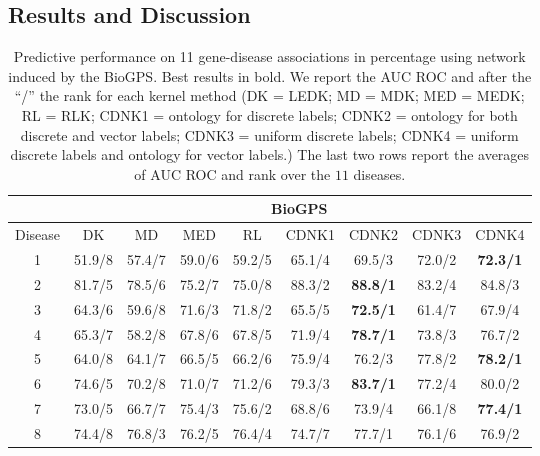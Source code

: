 \documentclass[review]{elsarticle}
\begin{document}
\subsection{Results and Discussion}
\begin{table}[h]
\caption{Predictive performance on 11 gene-disease associations in percentage using network induced by the BioGPS. Best results in bold. We report the AUC ROC and after the ``/'' the rank for each kernel method (DK = LEDK; MD = MDK; MED = MEDK; RL = RLK; CDNK1 = ontology for discrete labels; CDNK2 = ontology for both discrete and vector labels; CDNK3 = uniform discrete labels;  CDNK4 = uniform discrete labels and ontology for vector labels.) The last two rows report the averages of AUC ROC and rank over the $11$ diseases.} \vspace{1em}
\centering
\setlength{\tabcolsep}{1mm}
\begin{tabular}{|c|c|c|c|c|c|c|c|c|}
\hline
         & \multicolumn{8}{c|}{\textbf{BioGPS}}\\
 \hline
Disease & DK & MD & MED & RL & CDNK1 & CDNK2 & CDNK3 & CDNK4\\

 \hline
1 & 51.9/8 & 57.4/7 & 59.0/6 & 59.2/5 & 65.1/4 & 69.5/3 & 72.0/2 & \textbf{72.3/1} \\

2 & 81.7/5 & 78.5/6 & 75.2/7 & 75.0/8 & 88.3/2 & \textbf{88.8/1} & 83.2/4 & 84.8/3 \\

3 & 64.3/6 & 59.6/8 & 71.6/3 & 71.8/2 & 65.5/5 & \textbf{72.5/1} & 61.4/7 & 67.9/4 \\

4 & 65.3/7 & 58.2/8 & 67.8/6 & 67.8/5 & 71.9/4 & \textbf{78.7/1} & 73.8/3 & 76.7/2 \\

5 & 64.0/8 & 64.1/7 & 66.5/5 & 66.2/6 & 75.9/4 & 76.2/3 & 77.8/2 & \textbf{78.2/1} \\

6 & 74.6/5 & 70.2/8 & 71.0/7 & 71.2/6 & 79.3/3 & \textbf{83.7/1} & 77.2/4 & 80.0/2 \\

7 & 73.0/5 & 66.7/7 & 75.4/3 & 75.6/2 & 68.8/6 & 73.9/4 & 66.1/8 & \textbf{77.4/1} \\

8 & 74.4/8 & 76.8/3 & 76.2/5 & 76.4/4 & 74.7/7 & 77.7/1 & 76.1/6 & 76.9/2 \\


\end{tabular}
\end{table}
\end{document}
